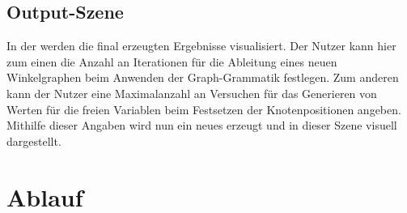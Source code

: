 \subsection{Output-Szene}
In der  werden die final erzeugten Ergebnisse visualisiert. Der Nutzer kann hier zum einen die Anzahl an Iterationen für die
Ableitung eines neuen Winkelgraphen beim Anwenden der Graph-Grammatik festlegen. Zum anderen kann der Nutzer eine Maximalanzahl an Versuchen
für das Generieren von Werten für die freien Variablen beim Festsetzen der Knotenpositionen angeben. Mithilfe dieser Angaben wird nun ein
neues  erzeugt und in dieser Szene visuell dargestellt.

\section{Ablauf}
